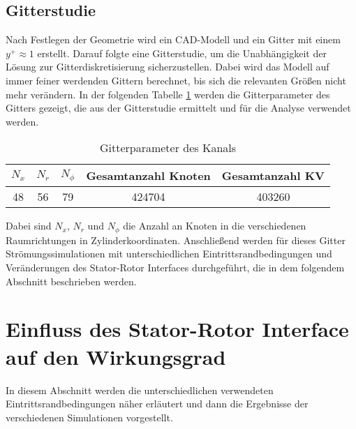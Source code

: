 \subsection{Gitterstudie}
\label{subsec:kanalgitterstudie}
Nach Festlegen der Geometrie wird ein CAD-Modell und ein Gitter mit einem $y^+ \approx 1$ erstellt. Darauf folgte eine Gitterstudie, um die Unabhängigkeit der Lösung zur Gitterdiskretisierung sicherzustellen. Dabei wird das Modell auf immer feiner werdenden Gittern berechnet, bis sich die relevanten Größen nicht mehr verändern. In der folgenden Tabelle \ref{tab:kanalgitter} werden die Gitterparameter des Gitters gezeigt, die aus der Gitterstudie ermittelt und für die Analyse verwendet werden. 
\begin{table}[H]
\centering
\caption{Gitterparameter des Kanals}
\begin{tabular}{ c| c| c| c| c}
$N_x$&$N_r$&$N_\phi$&Gesamtanzahl Knoten&Gesamtanzahl KV\\
\hline
48&56&79 &424704&403260\\
\end{tabular}
\label{tab:kanalgitter}
\end{table}
Dabei sind $N_x$, $N_r$ und $N_\phi$ die Anzahl an Knoten in die verschiedenen Raumrichtungen in Zylinderkoordinaten.\newline
Anschließend werden für dieses Gitter Strömungssimulationen mit unterschiedlichen Eintrittsrandbedingungen und Veränderungen des Stator-Rotor Interfaces durchgeführt, die in dem folgendem Abschnitt beschrieben werden.

\section{Einfluss des Stator-Rotor Interface auf den Wirkungsgrad}
\label{kanaleinfluss}
In diesem Abschnitt werden die unterschiedlichen verwendeten Eintrittsrandbedingungen näher erläutert und dann die Ergebnisse der verschiedenen Simulationen vorgestellt.
